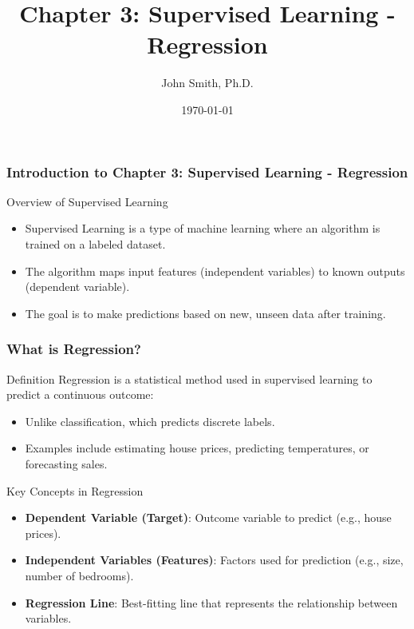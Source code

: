 \documentclass[aspectratio=169]{beamer}
\title[Supervised Learning - Regression]{Chapter 3: Supervised Learning - Regression}
\author[J. Smith]{John Smith, Ph.D.}
\institute[University Name]{
  Department of Computer Science\\
  University Name\\
  \vspace{0.3cm}
  Email: email@university.edu\\
  Website: www.university.edu
}
\date{\today}
\begin{document}
\frame{\titlepage}

\begin{frame}[fragile]
    \frametitle{Introduction to Chapter 3: Supervised Learning - Regression}
    \begin{block}{Overview of Supervised Learning}
        \begin{itemize}
            \item Supervised Learning is a type of machine learning where an algorithm is trained on a labeled dataset.
            \item The algorithm maps input features (independent variables) to known outputs (dependent variable).
            \item The goal is to make predictions based on new, unseen data after training.
        \end{itemize}
    \end{block}
\end{frame}

\begin{frame}[fragile]
    \frametitle{What is Regression?}
    \begin{block}{Definition}
        Regression is a statistical method used in supervised learning to predict a continuous outcome:
        \begin{itemize}
            \item Unlike classification, which predicts discrete labels.
            \item Examples include estimating house prices, predicting temperatures, or forecasting sales.
        \end{itemize}
    \end{block}
    
    \begin{block}{Key Concepts in Regression}
        \begin{itemize}
            \item \textbf{Dependent Variable (Target)}: Outcome variable to predict (e.g., house prices).
            \item \textbf{Independent Variables (Features)}: Factors used for prediction (e.g., size, number of bedrooms).
            \item \textbf{Regression Line}: Best-fitting line that represents the relationship between variables.
        \end{itemize}
    \end{block}
\end{frame}
\end{document}
